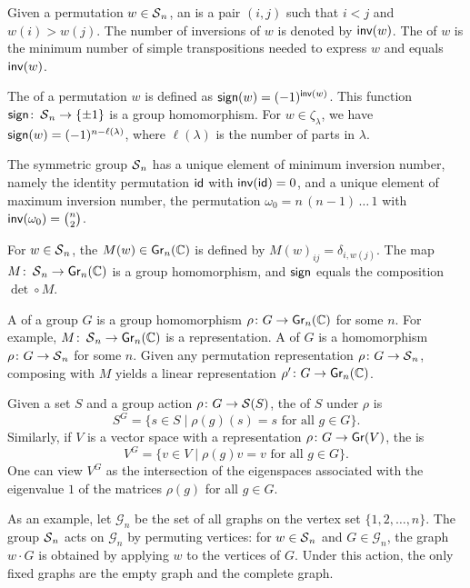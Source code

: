 Given a permutation \(w \in \operatorname{\mathcal{S}}_n\), an  is a pair \((i, j)\) such that \(i < j\) and \(w(i) > w(j)\). The number of inversions of \(w\) is denoted by \(\operatorname{\mathsf{inv}}(w)\). The  of \(w\) is the minimum number of simple transpositions needed to express \(w\) and equals \(\operatorname{\mathsf{inv}}(w)\).

The  of a permutation \(w\) is defined as \(\operatorname{\mathsf{sign}}(w) = (-1)^{\operatorname{\mathsf{inv}}(w)}\). This function \(\operatorname{\mathsf{sign}} \colon \operatorname{\mathcal{S}}_n \to \{\pm 1\}\) is a group homomorphism. For \(w \in \zeta_\lambda\), we have \(\operatorname{\mathsf{sign}}(w) = (-1)^{n - \ell(\lambda)}\), where \(\ell(\lambda)\) is the number of parts in \(\lambda\).

The symmetric group \(\operatorname{\mathcal{S}}_n\) has a unique element of minimum inversion number, namely the identity permutation \(\operatorname{\mathsf{id}}\) with \(\operatorname{\mathsf{inv}}(\operatorname{\mathsf{id}}) = 0\), and a unique element of maximum inversion number, the permutation \(\omega_0 = n\, (n-1)\, \ldots\, 1\) with \(\operatorname{\mathsf{inv}}(\omega_0) = \binom{n}{2}\).

For \(w \in \operatorname{\mathcal{S}}_n\), the  \(M(w) \in \operatorname{\mathsf{Gr}}_n(\mathbb{C})\) is defined by \(M(w)_{ij} = \delta_{i, w(j)}\). The map \(M \colon \operatorname{\mathcal{S}}_n \to \operatorname{\mathsf{Gr}}_n(\mathbb{C})\) is a group homomorphism, and \(\operatorname{\mathsf{sign}}\) equals the composition \(\det \circ M\).

A  of a group \(G\) is a group homomorphism \(\rho \colon G \to \operatorname{\mathsf{Gr}}_n(\mathbb{C})\) for some \(n\). For example, \(M \colon \operatorname{\mathcal{S}}_n \to \operatorname{\mathsf{Gr}}_n(\mathbb{C})\) is a representation. A  of \(G\) is a homomorphism \(\rho \colon G \to \operatorname{\mathcal{S}}_n\) for some \(n\). Given any permutation representation \(\rho \colon G \to \operatorname{\mathcal{S}}_n\), composing with \(M\) yields a linear representation \(\rho' \colon G \to \operatorname{\mathsf{Gr}}_n(\mathbb{C})\).

Given a set \(S\) and a group action \(\rho \colon G \to \operatorname{\mathcal{S}}(S)\), the  of \(S\) under \(\rho\) is
\[
    S^G = \{ s \in S \mid \rho(g)(s) = s \text{ for all } g \in G \}.
\]
Similarly, if \(V\) is a vector space with a representation \(\rho \colon G \to \operatorname{\mathsf{Gr}}(V)\), the  is
\[
    V^G = \{ v \in V \mid \rho(g)v = v \text{ for all } g \in G \}.
\]
One can view \(V^G\) as the intersection of the eigenspaces associated with the eigenvalue \(1\) of the matrices \(\rho(g)\) for all \(g \in G\).

As an example, let \(\mathcal{G}_n\) be the set of all graphs on the vertex set \(\{1, 2, \ldots, n\}\). The group \(\operatorname{\mathcal{S}}_n\) acts on \(\mathcal{G}_n\) by permuting vertices: for \(w \in \operatorname{\mathcal{S}}_n\) and \(G \in \mathcal{G}_n\), the graph \(w \cdot G\) is obtained by applying \(w\) to the vertices of \(G\). Under this action, the only fixed graphs are the empty graph and the complete graph.

